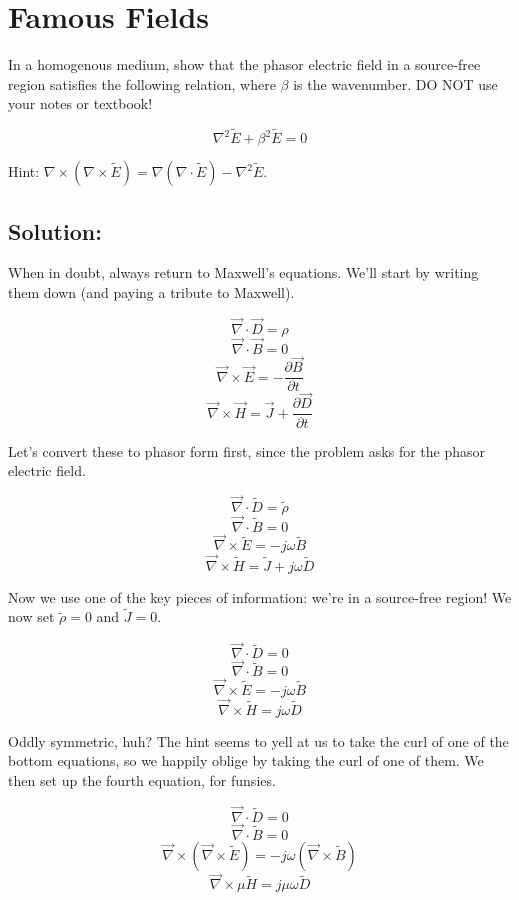 \documentclass{article}
\begin{document}
\newpage

\section{Famous Fields}

In a homogenous medium, show that the phasor electric field in a source-free region satisfies the following relation, where $\beta$ is the wavenumber. DO NOT use your notes or textbook!

\[
\nabla^2 \tilde{E} + \beta^2\tilde{E} = 0
\]

Hint: $\nabla\times(\nabla\times \tilde{E}) = \nabla(\nabla \cdot \tilde{E}) - \nabla^2 \tilde{E}$.

\subsection{Solution:}

When in doubt, always return to Maxwell's equations. We'll start by writing them down (and paying a tribute to Maxwell).

$$\vec{\nabla} \cdot \vec{D} = \rho$$
$$\vec{\nabla} \cdot \vec{B} = 0$$
$$\vec{\nabla} \times \vec{E} = -\frac{\partial{\vec{B}}}{\partial t}$$
$$\vec{\nabla} \times \vec{H} = \vec{J} + \frac{\partial{\vec{D}}}{\partial t}$$

Let's convert these to phasor form first, since the problem asks for the phasor electric field.

$$\vec{\nabla} \cdot \tilde{D} = \tilde{\rho}$$
$$\vec{\nabla} \cdot \tilde{B} = 0$$
$$\vec{\nabla} \times \tilde{E} = -j \omega \tilde{B}$$
$$\vec{\nabla} \times \tilde{H} = \tilde{J} + j \omega\tilde{D}$$

Now we use one of the key pieces of information: we're in a source-free region! We now set $\tilde{\rho} = 0$ and $\tilde{J} = 0$.

$$\vec{\nabla} \cdot \tilde{D} = 0$$
$$\vec{\nabla} \cdot \tilde{B} = 0$$
$$\vec{\nabla} \times \tilde{E} = -j \omega \tilde{B}$$
$$\vec{\nabla} \times \tilde{H} = j \omega\tilde{D}$$

Oddly symmetric, huh? The hint seems to yell at us to take the curl of one of the bottom equations, so we happily oblige by taking the curl of one of them. We then set up the fourth equation, for funsies.

$$\vec{\nabla} \cdot \tilde{D} = 0$$
$$\vec{\nabla} \cdot \tilde{B} = 0$$
$$\vec{\nabla} \times (\vec{\nabla} \times \tilde{E}) = - j \omega (\vec{\nabla} \times \tilde{B})$$
$$\vec{\nabla} \times \mu \tilde{H} = j \mu \omega\tilde{D}$$
\end{document}
